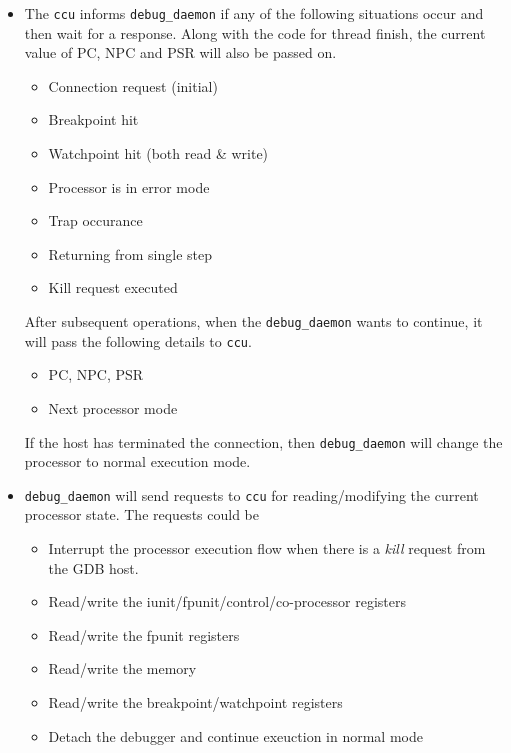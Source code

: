\documentclass[a4paper, 11pt]{article}
\begin{document}
\begin{itemize}
	\item The \texttt{ccu} informs \texttt{debug\_daemon} if any of the following situations occur and then wait for a response. Along with the code for thread finish, the current value of PC, NPC and PSR will also be passed on.
		\begin{itemize}
			\item Connection request (initial)
			\item Breakpoint hit
			\item Watchpoint hit (both read \& write)
			\item Processor is in error mode
			\item Trap occurance
			\item Returning from single step
			\item Kill request executed
		\end{itemize}
	After subsequent operations, when the \texttt{debug\_daemon} wants to continue, it will pass the following details to \texttt{ccu}.
		\begin{itemize}
			\item PC, NPC, PSR
			\item Next processor mode
		\end{itemize}
	 If the host has terminated the connection, then 
	 \texttt{debug\_daemon} will change the processor to normal execution mode.
	 
	\item \texttt{debug\_daemon} will send requests to  \texttt{ccu} for reading/modifying the current processor state. The requests could be 
		\begin{itemize}
			\item Interrupt the processor execution flow when there is a \textit{kill} request from the GDB host.
			\item Read/write the iunit/fpunit/control/co-processor registers
			\item Read/write the fpunit registers
			\item Read/write the memory
			\item Read/write the breakpoint/watchpoint registers
			\item Detach the debugger and continue exeuction in normal mode
		\end{itemize}

\end{itemize}

\vspace*{1cm}
\end{document}
